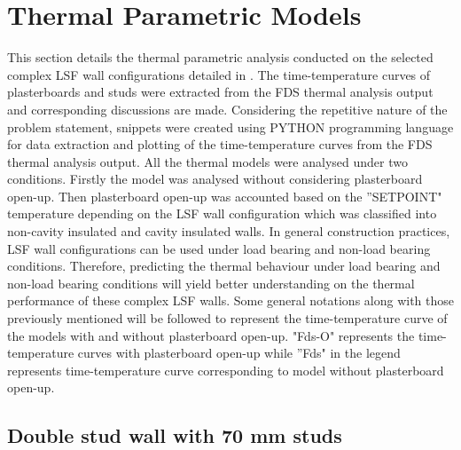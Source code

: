 \section{Thermal Parametric Models}\label{sec:thermal-parametric-models}

This section details the thermal parametric analysis conducted on the selected complex LSF wall configurations detailed in . The time-temperature curves of plasterboards and studs were extracted from the FDS thermal analysis output and corresponding discussions are made. Considering the repetitive nature of the problem statement, snippets were created using PYTHON programming language for data extraction and plotting of the time-temperature curves from the FDS thermal analysis output. All the thermal models were analysed under two conditions. Firstly the model was analysed without considering plasterboard open-up. Then plasterboard open-up was accounted based on the ''SETPOINT" temperature depending on the LSF wall configuration which was classified into non-cavity insulated and cavity insulated walls. In general construction practices, LSF wall configurations can be used under load bearing and non-load bearing conditions. Therefore, predicting the thermal behaviour under load bearing and non-load bearing conditions will yield better understanding on the thermal performance of these complex LSF walls. Some general notations along with those previously mentioned will be followed to represent the time-temperature curve of the models with and without plasterboard open-up. "Fds-O" represents the time-temperature curves with plasterboard open-up while ''Fds" in the legend represents time-temperature curve corresponding to model without plasterboard open-up.

\subsection{Double stud wall with 70 mm studs}\label{sec:ds-70-thermal-fds}

